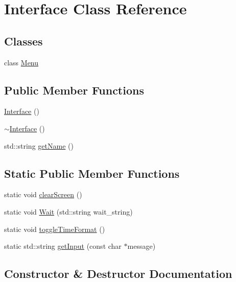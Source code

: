 \hypertarget{classInterface}{}\section{Interface Class Reference}
\label{classInterface}
\subsection*{Classes}
\begin{DoxyCompactItemize}
\item 
class \hyperlink{classInterface_1_1Menu}{Menu}
\end{DoxyCompactItemize}
\subsection*{Public Member Functions}
\begin{DoxyCompactItemize}
\item 
\hyperlink{classInterface_a4406d74c75bdfe150bf72be1f1cda8b1}{Interface} ()
\item 
\hyperlink{classInterface_a19179888f29f18f1be54a3dfe98f68c0}{$\sim$\+Interface} ()
\item 
std\+::string \hyperlink{classInterface_a73eee93e24c223cd265b5fb0ca1640b8}{get\+Name} ()
\end{DoxyCompactItemize}
\subsection*{Static Public Member Functions}
\begin{DoxyCompactItemize}
\item 
static void \hyperlink{classInterface_af92bb2aeecc6a19095af23fa78b49451}{clear\+Screen} ()
\item 
static void \hyperlink{classInterface_ab235ba2f0184e3fbfd5d5a64d5eb85ef}{Wait} (std\+::string wait\+\_\+string)
\item 
static void \hyperlink{classInterface_a2e002e61dc11cf4a1bd9c039704194df}{toggle\+Time\+Format} ()
\item 
static std\+::string \hyperlink{classInterface_aa5c0539404373d488986f030f7a84a6f}{get\+Input} (const char $\ast$message)
\end{DoxyCompactItemize}


\subsection{Constructor \& Destructor Documentation}

